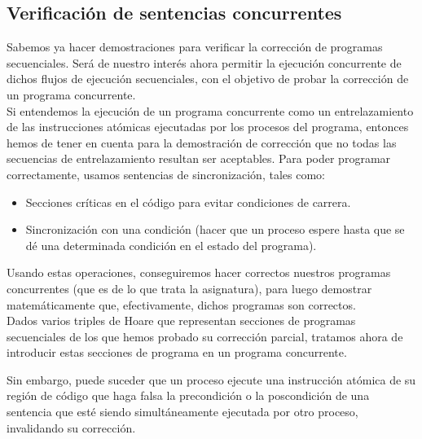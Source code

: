 \subsection{Verificación de sentencias concurrentes}
Sabemos ya hacer demostraciones para verificar la corrección de programas secuenciales. Será de nuestro interés ahora permitir la ejecución concurrente de dichos flujos de ejecución secuenciales, con el objetivo de probar la corrección de un programa concurrente.\\

Si entendemos la ejecución de un programa concurrente como un entrelazamiento de las instrucciones atómicas ejecutadas por los procesos del programa, entonces hemos de tener en cuenta para la demostración de corrección que no todas las secuencias de entrelazamiento resultan ser aceptables. Para poder programar correctamente, usamos sentencias de sincronización, tales como:
\begin{itemize}
    \item Secciones críticas en el código para evitar condiciones de carrera.
    \item Sincronización con una condición (hacer que un proceso espere hasta que se dé una determinada condición en el estado del programa).
\end{itemize}
Usando estas operaciones, conseguiremos hacer correctos nuestros programas concurrentes (que es de lo que trata la asignatura), para luego demostrar matemáticamente que, efectivamente, dichos programas son correctos.\\

Dados varios triples de Hoare que representan secciones de programas secuenciales de los que hemos probado su corrección parcial, tratamos ahora de introducir estas secciones de programa en un programa concurrente.

Sin embargo, puede suceder que un proceso ejecute una instrucción atómica de su región de código que haga falsa la precondición o la poscondición de una sentencia que esté siendo simultáneamente ejecutada por otro proceso, invalidando su corrección.

